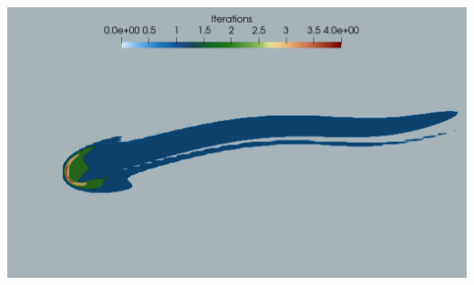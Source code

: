 \documentclass[a0paper,portrait]{baposter}
\begin{document}
\begin{poster}
{\begin{minipage}{1\linewidth}
		    \end{minipage}
		    \begin{minipage}{1\linewidth}
			    \includegraphics[width=\linewidth]{Odepim.png}
		    \end{minipage}
			
		}	
		
\end{poster}
\end{document}
